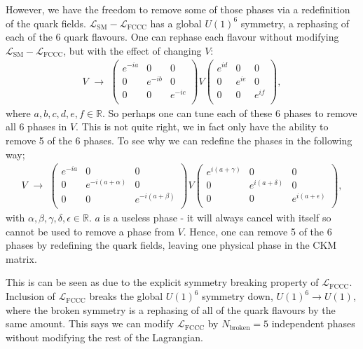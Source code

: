 However, we have the freedom to remove some of those phases via a redefinition of the quark fields. $\mathcal{L}_{\text{SM}} - \mathcal{L}_{\text{FCCC}}$ has a global $U(1)^6$ symmetry, a rephasing of each of the 6 quark flavours. One can rephase each flavour without modifying $\mathcal{L}_{\text{SM}} - \mathcal{L}_{\text{FCCC}}$, but with the effect of changing $V$:
\begin{align}
  V \,\,\to \,\,
  \begin{pmatrix}
    e^{-ia} & 0 & 0 \\
    0 & e^{-ib} & 0 \\
    0 & 0 & e^{-ic} \\
  \end{pmatrix}
  V
  \begin{pmatrix}
    e^{id} & 0 & 0 \\
    0 & e^{ie} & 0 \\
    0 & 0 & e^{if} \\
  \end{pmatrix},
\end{align}
where $a,b,c,d,e,f\in \mathbb{R}$. So perhaps one can tune each of these 6 phases to remove all 6 phases in $V$. This is not quite right, we in fact only have the ability to remove 5 of the 6 phases. To see why we can redefine the phases in the following way;
\begin{align}
  V \,\,\to \,\,
  \begin{pmatrix}
    e^{-ia} & 0 & 0 \\
    0 & e^{-i(a+\alpha)} & 0 \\
    0 & 0 & e^{-i(a+\beta)} \\
  \end{pmatrix}
  V
  \begin{pmatrix}
    e^{i(a+\gamma)} & 0 & 0 \\
    0 & e^{i(a+\delta)} & 0 \\
    0 & 0 & e^{i(a+\epsilon)} \\
  \end{pmatrix},
\end{align}
with $\alpha,\beta,\gamma,\delta,\epsilon\in\mathbb{R}$. $a$ is a useless phase - it will always cancel with itself so cannot be used to remove a phase from $V$. Hence, one can remove 5 of the 6 phases by redefining the quark fields, leaving one physical phase in the CKM matrix.

This is can be seen as due to the explicit symmetry breaking property of $\mathcal{L}_{\text{FCCC}}$. Inclusion of $\mathcal{L}_{\text{FCCC}}$ breaks the global $U(1)^6$  symmetry down, $U(1)^6 \to U(1)$, where the broken symmetry is a rephasing of all of the quark flavours by the same amount. This says we can modify $\mathcal{L}_{\text{FCCC}}$ by $N_{\text{broken}} = 5$ independent phases without modifying the rest of the Lagrangian.

